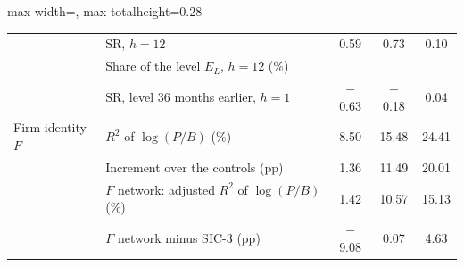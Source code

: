 \begin{table}[htbp]
{\begin{adjustbox}{max width=\linewidth, max totalheight=0.28\textheight}
\begin{tabular}{llccc}
 & SR, $h=12$ & \phantom{$-$(0}0.59\phantom{)} & \phantom{$-$(0}0.73\phantom{)} & \phantom{(0}0.10\phantom{)} \\
 & Share of the level $E_L$, $h=12$ (\%) &  &  &  \\
 & SR, level 36 months earlier, $h=1$ & \phantom{(0}$-$0.63\phantom{)} & \phantom{(0}$-$0.18\phantom{)} & \phantom{(0}0.04\phantom{)} \\
\midrule
Firm identity $F$ & $R^2$ of $\log(P/B)$ (\%) & \phantom{$-$(0}8.50\phantom{)} & \phantom{$-$(}15.48\phantom{)} & \phantom{(}24.41\phantom{)} \\
 & Increment over the controls (pp) & \phantom{$-$(0}1.36\phantom{)} & \phantom{$-$(}11.49\phantom{)} & \phantom{(}20.01\phantom{)} \\
 & $F$ network: adjusted $R^2$ of $\log(P/B)$ (\%) & \phantom{$-$(0}1.42\phantom{)} & \phantom{$-$(}10.57\phantom{)} & \phantom{(}15.13\phantom{)} \\
 & $F$ network minus SIC-3 (pp) & \phantom{(0}$-$9.08\phantom{)} & \phantom{$-$(0}0.07\phantom{)} & \phantom{(0}4.63\phantom{)} \\
\bottomrule
\end{tabular}
\end{adjustbox}
}
\end{table}
